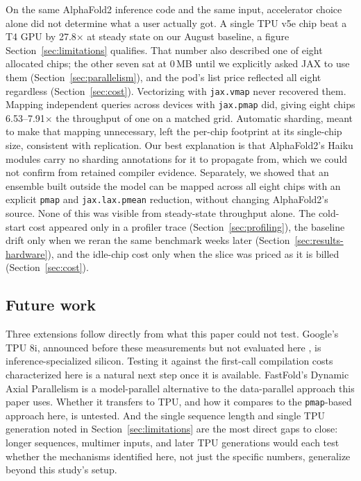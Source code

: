 
On the same AlphaFold2 inference code and the same input, accelerator
choice alone did not determine what a user actually got. A single TPU
v5e chip beat a T4 GPU by 27.8$\times$ at steady state on our August
baseline, a figure Section~\ref{sec:limitations} qualifies. That
number also described one of eight allocated chips; the other seven sat at
0\,MB until we explicitly asked JAX to use them
(Section~\ref{sec:parallelism}), and the pod's list price reflected
all eight regardless (Section~\ref{sec:cost}). Vectorizing with
\texttt{jax.vmap} never recovered them. Mapping independent queries
across devices with \texttt{jax.pmap} did, giving eight chips
6.53--7.91$\times$ the throughput of one on a matched grid. Automatic sharding, meant to make that mapping
unnecessary, left the per-chip footprint at its single-chip size,
consistent with replication. Our best explanation is that AlphaFold2's
Haiku modules carry no sharding annotations for it to propagate from,
which we could not confirm from retained compiler evidence. Separately,
we showed that an ensemble built outside the model can be mapped
across all eight chips with an explicit \texttt{pmap} and
\texttt{jax.lax.pmean} reduction, without changing AlphaFold2's
source. None of this was
visible from steady-state throughput alone. The cold-start cost
appeared only in a profiler trace (Section~\ref{sec:profiling}), the
baseline drift only when we reran the same benchmark weeks later
(Section~\ref{sec:results-hardware}), and the idle-chip cost only when
the slice was priced as it is billed (Section~\ref{sec:cost}).

\subsection*{Future work}

Three extensions follow directly from what this paper could not test.
Google's TPU 8i, announced before these measurements but not evaluated
here \citep{googletpuv8ann2026}, is inference-specialized silicon.
Testing it against the first-call compilation costs characterized here
is a natural next step once it is available.
FastFold's Dynamic Axial Parallelism is a model-parallel alternative
to the data-parallel approach this paper uses. Whether it transfers to
TPU, and how it compares to the \texttt{pmap}-based approach here, is
untested. And the single sequence length and single TPU generation
noted in Section~\ref{sec:limitations} are the most direct gaps to
close: longer sequences, multimer inputs, and later TPU generations
would each test whether the mechanisms identified here, not just the
specific numbers, generalize beyond this study's setup.
